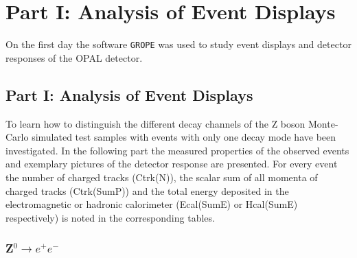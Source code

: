 \documentclass[11pt, a4paper]{article}
\numberwithin{equation}{section}
\begin{document}
\section{Part I: Analysis of Event Displays}

On the first day the software \texttt{GROPE} was used to study event displays and detector responses of the OPAL detector.

\subsection{Part I: Analysis of Event Displays}

To learn how to distinguish the different decay channels of the Z boson Monte-Carlo simulated test samples with events with only one decay mode have been investigated.
In the following part the measured properties of the observed events and exemplary pictures of the detector response are presented.
For every event the number of charged tracks (Ctrk(N)), the scalar sum of all momenta of charged tracks (Ctrk(SumP)) and the total energy deposited in the electromagnetic or hadronic calorimeter (Ecal(SumE) or Hcal(SumE) respectively) is noted in the corresponding tables.
\clearpage
\subsubsection{Z$^0\rightarrow e^+e^-$}
\end{document}
